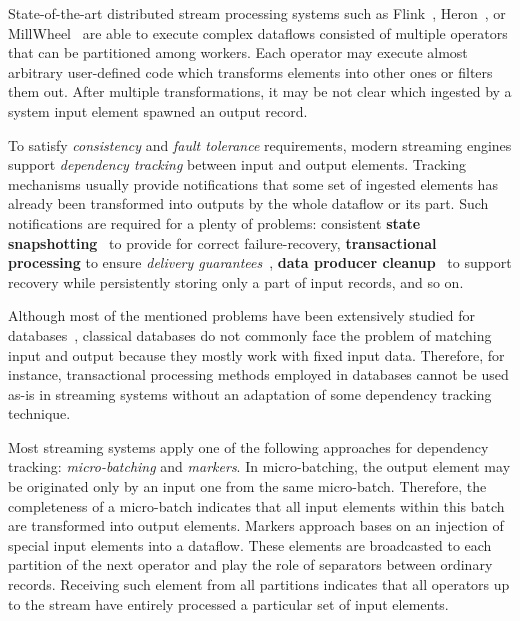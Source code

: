 \label {fs-acker-intro}

State-of-the-art distributed stream processing systems such as Flink~\cite{Carbone:2017:SMA:3137765.3137777}, Heron~\cite{Kulkarni:2015:THS:2723372.2742788}, or MillWheel~\cite{Akidau:2013:MFS:2536222.2536229} are able to execute complex dataflows consisted of multiple operators that can be partitioned among workers. Each operator may execute almost arbitrary user-defined code which transforms elements into other ones or filters them out. After multiple transformations, it may be not clear which ingested by a system input element spawned an output record. 

To satisfy {\em consistency} and {\em fault tolerance} requirements, modern streaming engines support {\em dependency tracking} between input and output elements. Tracking mechanisms usually provide notifications that some set of ingested elements has already been transformed into outputs by the whole dataflow or its part. Such notifications are required for a plenty of problems: consistent {\bf state snapshotting}~\cite{Akidau:2013:MFS:2536222.2536229, 2015arXiv150608603C} to provide for correct failure-recovery, {\bf transactional processing} to ensure {\em delivery guarantees}~\cite{thepaper, Carbone:2017:SMA:3137765.3137777}, {\bf data producer cleanup}~\cite{Noghabi:2017:SSS:3137765.3137770} to support recovery while persistently storing only a part of input records, and so on. 

Although most of the mentioned problems have been extensively studied for databases~\cite{DBLP:books/mk/WeikumV2002}, classical databases do not commonly face the problem of matching input and output because they mostly work with fixed input data. Therefore, for instance, transactional processing methods employed in databases cannot be used as-is in streaming systems without an adaptation of some dependency tracking technique.

Most streaming systems apply one of the following approaches for dependency tracking: {\em micro-batching} and {\em markers}. In micro-batching, the output element may be originated only by an input one from the same micro-batch. Therefore, the completeness of a micro-batch indicates that all input elements within this batch are transformed into output elements. Markers approach bases on an injection of special input elements into a dataflow. These elements are broadcasted to each partition of the next operator and play the role of separators between ordinary records. Receiving such element from all partitions indicates that all operators up to the stream have entirely processed a particular set of input elements. 

